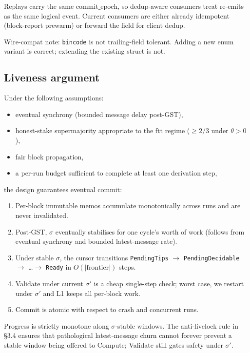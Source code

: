 \documentclass[11pt]{article}
\newcommand{\sigid}{\ensuremath{\sigma}}
\newcommand{\code}[1]{\texttt{#1}}
\begin{document}
Replays carry the same $\text{commit\_epoch}$, so dedup-aware consumers
treat re-emits as the same logical event. Current consumers are either
already idempotent (block-report prewarm) or forward the field for
client dedup.

Wire-compat note: \code{bincode} is not trailing-field tolerant.
Adding a new enum variant is correct; extending the existing struct
is not.

\subsection{Liveness argument}
\label{sec:liveness}

Under the following assumptions:
\begin{itemize}[nosep]
\item eventual synchrony (bounded message delay post-GST),
\item honest-stake supermajority appropriate to the ftt regime
      ($\ge 2/3$ under $\theta > 0$),
\item fair block propagation,
\item a per-run budget sufficient to complete at least one derivation
      step,
\end{itemize}
the design guarantees eventual commit:

\begin{enumerate}[label=\textbf{L\arabic*.}, leftmargin=2em]
\item Per-block immutable memos accumulate monotonically across runs
and are never invalidated.
\item Post-GST, $\sigid$ eventually stabilises for one cycle's worth of
work (follows from eventual synchrony and bounded latest-message rate).
\item Under stable $\sigid$, the cursor transitions
\code{PendingTips} $\to$ \code{PendingDecidable} $\to$ \ldots $\to$
\code{Ready} in $O(|\text{frontier}|)$ steps.
\item Validate under current $\sigid'$ is a cheap single-step check;
worst case, we restart under $\sigid'$ and L1 keeps all per-block work.
\item Commit is atomic with respect to crash and concurrent runs.
\end{enumerate}

Progress is strictly monotone along $\sigid$-stable windows. The
anti-livelock rule in \S3.4 ensures that pathological
latest-message churn cannot forever prevent a stable window being
offered to Compute; Validate still gates safety under $\sigid'$.
\end{document}
